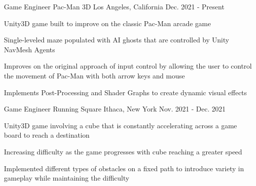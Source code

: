 
\begin{cventries}
  \cventry
    {Game Engineer}
    {Pac-Man 3D}
    {Los Angeles, California}
    {Dec. 2021 - Present}
    {
      \begin{cvitems}
        \item {Unity3D game built to improve on the classic Pac-Man arcade game}
        \item {Single-leveled maze populated with AI ghosts that are controlled by Unity NavMesh Agents}
        \item{Improves on the original approach of input control by allowing the user to
control the movement of Pac-Man with both arrow keys and mouse}
		\item{Implements Post-Processing and Shader Graphs to create dynamic visual effects}
      \end{cvitems}
    }

  \cventry
    {Game Engineer}
    {Running Square}
    {Ithaca, New York}
    {Nov. 2021 - Dec. 2021}
    {
      \begin{cvitems}
        \item {Unity3D game involving a cube that is constantly accelerating across a game board to reach a destination}
        \item {Increasing difficulty as the game progresses with cube reaching a greater speed}
        \item {Implemented different types of obstacles on a fixed path to introduce variety in gameplay while maintaining the difficulty}
      \end{cvitems}
    }

\end{cventries}
